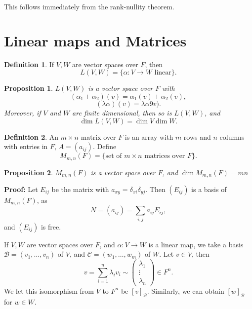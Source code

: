 \documentclass[12pt]{article}
\newtheorem{proposition}{Proposition}[section]
\theoremstyle{definition}
\newtheorem{definition}{Definition}[section]
\theoremstyle{remark}
\begin{document}
This follows immediately from the rank-nullity theorem.

\newpage

\section{Linear maps and Matrices}%
\label{sec:linear_maps_and_matrices}

\begin{definition}
	If $V, W$ are vector spaces over $F$, then
	\[
		L(V, W) = \{\alpha : V \to W \text{ linear}\}
	.\]
\end{definition}

\begin{proposition}
	$L(V, W)$ is a vector space over $F$ with
	\[
		(\alpha_1 + \alpha_2)(v) = \alpha_1(v) + \alpha_2(v)
	,\]
	\[
		(\lambda \alpha)(v) = \lambda \alpha 9v)
	.\]
	Moreover, if $V$ and $W$ are finite dimensional, then so is $L(V, W)$, and
	\[
		\dim L(V, W) = \dim V \dim W
	.\]
\end{proposition}

\begin{definition}
	An $m \times n$ matrix over $F$ is an array with $m$ rows and $n$ columns with entries in $F$, $A = (a_{ij})$. Define
	\[
		M_{m, n}(F) = \{\text{set of } m \times n \text{ matrices over } F\}
	.\]
\end{definition}

\begin{proposition}
	$M_{m, n}(F)$ is a vector space over $F$, and $\dim M_{m, n}(F) = mn$
\end{proposition}

\begin{adjustbox}{minipage = \columnwidth - 25.5pt, margin=1em, frame=1pt, margin=0em}
	\textbf{Proof:} Let $E_{ij}$ be the matrix with $a_{xy} = \delta_{xi}\delta_{yj}$. Then $(E_{ij})$ is a basis of $M_{m, n}(F)$, as
	\[
		N = (a_{ij}) = \sum_{i, j}a_{ij} E_{ij}
	,\]
	and $(E_{ij})$ is free.
\end{adjustbox}

If $V, W$ are vector spaces over $F$, and $\alpha : V \to W$ is a linear map, we take a basis $\mathcal{B} = (v_1, \ldots, v_n)$ of $V$, and $\mathcal{C} = (w_1, \ldots, w_m)$ of $W$. Let $v \in V$, then
\[
v = \sum_{i = 1}^{n} \lambda_i v_i \sim
\begin{pmatrix}
	\lambda_1 \\
	\vdots \\
	\lambda_n
\end{pmatrix}
 \in F^{n}
.\]
We let this isomorphism from $V$ to $F^{n}$ be $[v]_{\mathcal{B}}$. Similarly, we can obtain $[w]_{\mathcal{B}}$ for $w \in W$.
\end{document}

